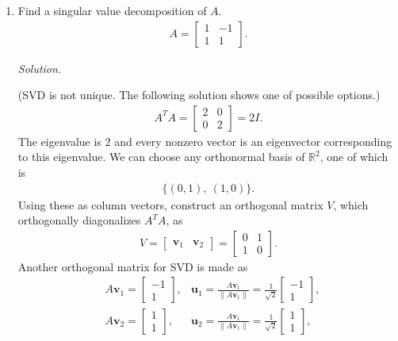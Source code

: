 \documentclass{article}
\begin{document}
\begin{enumerate}
\item
Find a singular value decomposition of $A$.
	\begin{align*}
	A=\left[\begin{array}{ll} 1&-1\\ 1&1\end{array}\right].	
	\end{align*}

\emph{Solution.}

(SVD is not unique. The following solution shows one of possible options.)
	\begin{align*}
	A^TA	=\left[\begin{array}{ll} 2 & 0\\0&2\end{array}\right]=2I.
	\end{align*}
The eigenvalue is $2$ and every nonzero vector is an eigenvector corresponding to this eigenvalue.
We can choose any orthonormal basis of $\mathbb{R}^2$, one of which is
	\begin{align*}
	\{(0,1),~(1,0)\}.	
	\end{align*}
Using these as column vectors, construct an orthogonal matrix $V$, which orthogonally diagonalizes $A^TA$, as
	\begin{align*}
	V=\left[\begin{array}{ll}\mathbf{v}_1 &\mathbf{v}_2\end{array} \right]=\left[\begin{array}{ll} 0&1\\ 1&0\end{array}\right].	
	\end{align*}
Another orthogonal matrix for SVD is made as
	\begin{align*}
	&A\mathbf{v}_1=\left[\begin{array}{l}-1\\1\end{array}\right],&\mathbf{u}_1=\frac{A\mathbf{v}_1}{\|A\mathbf{v}_1\|}=\frac{1}{\sqrt{2}}\left[\begin{array}{l}-1\\1\end{array}\right],\\
	&A\mathbf{v}_2=\left[\begin{array}{l}1\\1\end{array}\right],&\mathbf{u}_2=\frac{A\mathbf{v}_1}{\|A\mathbf{v}_1\|}=\frac{1}{\sqrt{2}}\left[\begin{array}{l}1\\1\end{array}\right],

\end{align*}
\end{enumerate}
\end{document}
